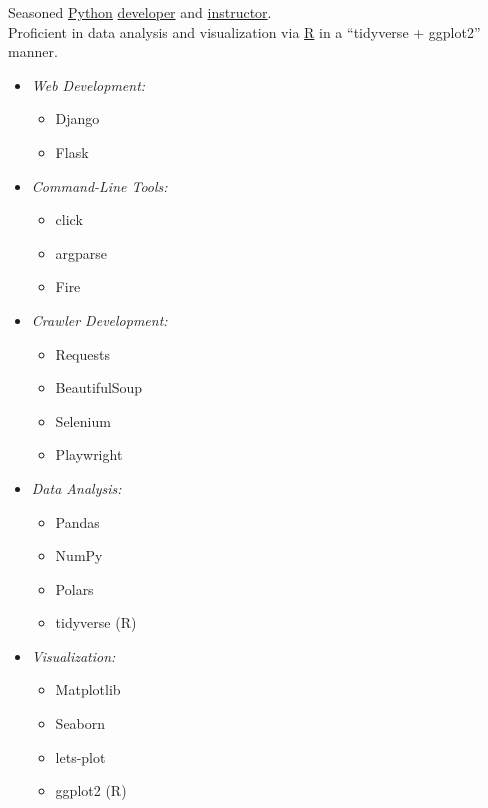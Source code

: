 Seasoned \underline{Python} \href{https://github.com/hermanzhaozzzz}{developer} 
and \href{https://www.bioinfo.info/p/t_pc/goods_pc_detail/goods_detail/course_2SvfNlIVzrKfOcexHk9Nute5Bhd}{instructor}.\\
Proficient in data analysis and visualization via \underline{R} in a ``tidyverse + ggplot2'' manner.
\vspace{-1em}
\begin{multicols}{3} %
\begin{itemize}  
    \item \textit{Web Development:}  
    \begin{itemize}
        \item Django  
        \item Flask  
    \end{itemize}  
  
    \item \textit{Command-Line Tools:}  
    \begin{itemize}  
        \item click  
        \item argparse  
        \item Fire  
    \end{itemize}  
  
    \item \textit{Crawler Development:}  
    \begin{itemize}  
        \item Requests  
        \item BeautifulSoup  
        \item Selenium  
        \item Playwright  
    \end{itemize}  
  
    \item \textit{Data Analysis:}  
    \begin{itemize}  
        \item Pandas  
        \item NumPy  
        \item Polars  
        \item tidyverse (R)  
    \end{itemize}  
\end{itemize}  

\columnbreak %
  
\begin{itemize}  
    \item \textit{Visualization:}  
    \begin{itemize}  
        \item Matplotlib  
        \item Seaborn  
        \item lets-plot  
        \item ggplot2 (R)  
    \end{itemize}  


\end{itemize}
\end{multicols}
